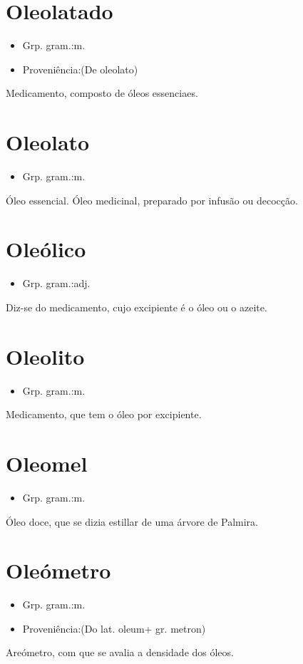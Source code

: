 \section{Oleolatado}
\begin{itemize}
\item {Grp. gram.:m.}
\end{itemize}
\begin{itemize}
\item {Proveniência:(De \textunderscore oleolato\textunderscore )}
\end{itemize}
Medicamento, composto de óleos essenciaes.
\section{Oleolato}
\begin{itemize}
\item {Grp. gram.:m.}
\end{itemize}
Óleo essencial.
Óleo medicinal, preparado por infusão ou decocção.
\section{Oleólico}
\begin{itemize}
\item {Grp. gram.:adj.}
\end{itemize}
Diz-se do medicamento, cujo excipiente é o óleo ou o azeite.
\section{Oleolito}
\begin{itemize}
\item {Grp. gram.:m.}
\end{itemize}
Medicamento, que tem o óleo por excipiente.
\section{Oleomel}
\begin{itemize}
\item {Grp. gram.:m.}
\end{itemize}
Óleo doce, que se dizia estillar de uma árvore de Palmira.
\section{Oleómetro}
\begin{itemize}
\item {Grp. gram.:m.}
\end{itemize}
\begin{itemize}
\item {Proveniência:(Do lat. \textunderscore oleum\textunderscore  + gr. \textunderscore metron\textunderscore )}
\end{itemize}
Areómetro, com que se avalia a densidade dos óleos.
